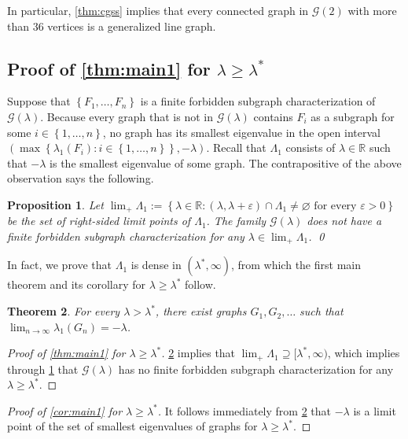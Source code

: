 \documentclass[11pt]{article}
\newtheorem{theorem}{Theorem}[section]
\newtheorem{proposition}[theorem]{Proposition}
\theoremstyle{definition}
\theoremstyle{remark}
\newcommand{\dset}[2]{\left\{{#1}\colon{#2}\right\}}
\newcommand{\sset}[1]{\left\{{#1}\right\}}
\newcommand{\eps}{\varepsilon}
\newcommand{\la}{\lambda}
\newcommand{\La}{\Lambda}
\newcommand{\G}{\mathcal{G}}
\newcommand{\R}{\mathbb{R}}
\newcommand{\Gl}{\G(\la)}
\begin{document}
In particular, \cref{thm:cgss} implies that every connected graph in $\G(2)$ with more than $36$ vertices is a generalized line graph.

\subsection{Proof of \texorpdfstring{\cref{thm:main1}}{the first main theorem} for \texorpdfstring{$\la \ge \la^*$}{λ ≥ λ*}}

Suppose that $\sset{F_1, \dots, F_n}$ is a finite forbidden subgraph characterization of $\Gl$. Because every graph that is not in $\Gl$ contains $F_i$ as a subgraph for some $i \in \sset{1, \dots, n}$, no graph has its smallest eigenvalue in the open interval $(\max\dset{\la_1(F_i)}{i \in \sset{1, \dots, n}},-\la)$. Recall that $\La_1$ consists of $\la \in \R$ such that $-\la$ is the smallest eigenvalue of some graph. The contrapositive of the above observation says the following.

\begin{proposition} \label{lem:limit-points}
    Let $\lim_+ \La_1 := \dset{\la \in \R}{(\la, \la + \eps) \cap \La_1 \neq \varnothing \text{ for every }\eps > 0}$ be the set of right-sided limit points of $\La_1$. The family $\Gl$ does not have a finite forbidden subgraph characterization for any $\la \in \lim_+ \La_1$. \qed
\end{proposition}

In fact, we prove that $\La_1$ is dense in $(\la^*, \infty)$, from which the first main theorem and its corollary for $\la \ge \la^*$ follow.

\begin{theorem} \label{thm:main1-3}
    For every $\la > \la^*$, there exist graphs $G_1, G_2, \dots$ such that $\lim_{n\to\infty} \la_1(G_n) = -\la$.
\end{theorem}

\begin{proof}[Proof of \cref{thm:main1} for $\la \ge \la^*$]
    \cref{thm:main1-3} implies that $\lim_+\La_1 \supseteq [\la^*, \infty)$, which implies through \cref{lem:limit-points} that $\Gl$ has no finite forbidden subgraph characterization for any $\la \ge \la^*$.
\end{proof}

\begin{proof}[Proof of \cref{cor:main1} for $\la \ge \la^*$]
    It follows immediately from \cref{thm:main1-3} that $-\la$ is a limit point of the set of smallest eigenvalues of graphs for $\la \ge \la^*$.
\end{proof}
\end{document}
